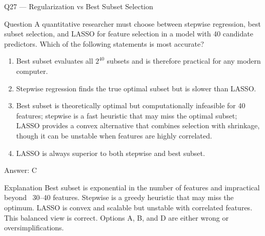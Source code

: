 \documentclass[aspectratio=169,8pt]{beamer}
\begin{document}
	\begin{frame}{Q27 --- Regularization vs Best Subset Selection}
		\begin{block}{Question}
			A quantitative researcher must choose between stepwise regression, best subset selection, and LASSO for feature selection in a model with 40 candidate predictors. Which of the following statements is most accurate?
		\end{block}
		\begin{enumerate}
			\item Best subset evaluates all $2^{40}$ subsets and is therefore practical for any modern computer.
			\item Stepwise regression finds the true optimal subset but is slower than LASSO.
			\item Best subset is theoretically optimal but computationally infeasible for 40 features; stepwise is a fast heuristic that may miss the optimal subset; LASSO provides a convex alternative that combines selection with shrinkage, though it can be unstable when features are highly correlated.
			\item LASSO is always superior to both stepwise and best subset.
		\end{enumerate}
		\begin{exampleblock}{Answer: C}\end{exampleblock}
		\begin{block}{Explanation}
			Best subset is exponential in the number of features and impractical beyond ~30--40 features. Stepwise is a greedy heuristic that may miss the optimum. LASSO is convex and scalable but unstable with correlated features. This balanced view is correct. Options A, B, and D are either wrong or oversimplifications.
		\end{block}
	\end{frame}
	
\end{document}
